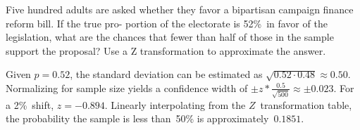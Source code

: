 \begin{problem}
   Five hundred adults are asked whether they favor a bipartisan campaign finance reform bill. If the true pro- portion of the electorate is 52\%~in favor of the legislation, what are the chances that fewer than half of those in the sample support the proposal? Use a Z transformation to approximate the answer.
\end{problem}

Given ${p=0.52}$, the standard deviation can be estimated as ${\sqrt{0.52 \cdot 0.48} \approx 0.50}$.  Normalizing for sample size yields a confidence width of ${\pm z * \frac{0.5}{\sqrt{500}} \approx \pm 0.023}$.  For a 2\%~shift, ${z=-0.894}$.  Linearly interpolating from the $Z$~transformation table, the probability the sample is less than~50\% is approximately~$\boxed{0.1851}$.
